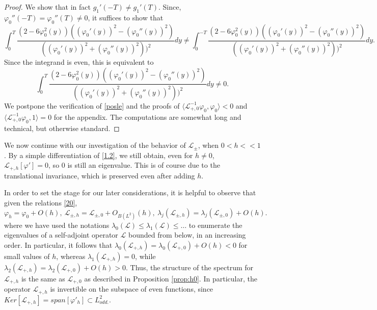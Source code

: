 \documentclass[12pt]{amsart}
\theoremstyle{definition}
\theoremstyle{remark}
\numberwithin{equation}{section}
\renewcommand{\(}{\left(}
\renewcommand{\)}{\right)}
\renewcommand{\[}{\left[}
\renewcommand{\]}{\right]}
\newcommand{\f}[2]{\frac{#1}{#2}}
\newcommand{\cl}{{\mathcal L}}
\newcommand{\la}{\lambda}
\newcommand{\vp}{\varphi}
\newcommand{\dpr}[2]{\langle #1,#2 \rangle}
\begin{document}
\begin{proof}
We show that in fact $g_1'(-T)\neq g_1'(T)$. Since, $\vp_0''(-T)=\vp_0''(T)\neq 0$, it suffices to show that
$$
\int_0^T \f{(2-6\vp_0^2(y))((\vp_0'(y))^2-(\vp_0''(y))^2)}{((\vp_0'(y))^2+(\vp_0''(y))^2))^2} dy\neq \int_0^{-T} \f{(2-6\vp_0^2(y))((\vp_0'(y))^2-(\vp_0''(y))^2)}{((\vp_0'(y))^2+(\vp_0''(y))^2))^2} dy.
$$
Since the integrand is even, this is equivalent to
\begin{equation}
\label{posle}
\int_0^T \f{(2-6\vp_0^2(y))((\vp_0'(y))^2-(\vp_0''(y))^2)}{((\vp_0'(y))^2+(\vp_0''(y))^2))^2} dy\neq 0.
\end{equation}
We postpone the verification of \eqref{posle} and the proofs of $\dpr{\cl_{+,0}^{-1} \vp_0}{\vp_0}<0$
and $\dpr{\cl_{+,0}^{-1} \vp_0}{1}=0$ for the appendix.  The computations are somewhat  long and technical, but otherwise standard.
 \end{proof}


 We now continue with our investigation of the behavior of $\cl_{\pm}$, when $0<h<<1$. By a simple differentiation of \eqref{1.2}, we still obtain, even for $h\neq 0$, $\cl_{+,h}[\vp']=0$, so $0$ is still an eigenvalue. This is of course due to the translational invariance, which is preserved even after adding $h$.

 In order to set the stage for our later considerations, it is helpful to observe that given the relations \eqref{20},
 $$
 \vp_h=\vp_0+O(h), \ \cl_{\pm,h}=\cl_{\pm,0}+O_{B(L^2)}(h), \ \la_j(\cl_{\pm,h})=\la_j(\cl_{\pm,0})+O(h).
 $$
where we have used the notations $\la_0(\cl)\leq \la_1(\cl)\leq \ldots $ to enumerate the eigenvalues of a self-adjoint operator $\cl$ bounded from below,  in an increasing order.  In particular, it follows that $\la_0(\cl_{+,h})=\la_0(\cl_{+,0})+O(h)<0$ for small values of $h$, whereas $\la_1(\cl_{+,h})=0$, while $\la_2(\cl_{+,h})=\la_2(\cl_{+,0})+O(h)>0$. Thus, the structure of the spectrum for $\cl_{+,h}$ is the same as $\cl_{+,0}$ as described in Proposition \ref{prop:h0}. In particular, the operator $\cl_{+,h}$ is invertible on the subspace of even functions, since $Ker[\cl_{+,h}]=span[\vp'_h]\subset L^2_{odd.}$.
\end{document}
